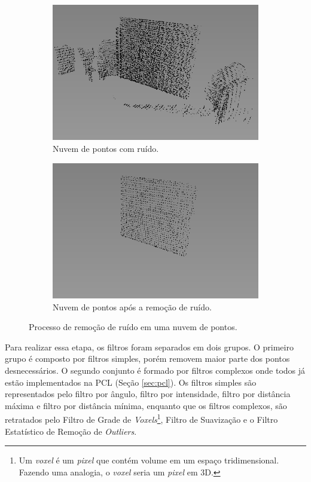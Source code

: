 \begin{figure}[H]
    \centering
    \begin{subfigure}[t]{0.49\textwidth}
        \includegraphics[width=\textwidth]{dados/figuras/pc_noise.png}
        \caption{Nuvem de pontos com ruído.}
    \end{subfigure}
    \begin{subfigure}[t]{0.49\textwidth}
        \includegraphics[width=\textwidth]{dados/figuras/pc_denoise.png}
        \caption{Nuvem de pontos após a remoção de ruído.}
    \end{subfigure}
    \caption{Processo de remoção de ruído em uma nuvem de pontos.}
    \label{fig:point_cloud_denoise}
\end{figure}

Para realizar essa etapa, os filtros foram separados em dois grupos.
O primeiro grupo é composto por filtros simples, porém removem maior parte dos pontos desnecessários. 
O segundo conjunto é formado por filtros complexos onde todos já estão implementados na PCL (Seção \ref{sec:pcl}).
Os filtros simples são representados pelo filtro por ângulo, filtro por intensidade, filtro por distância máxima e filtro por distância mínima, enquanto que os filtros complexos, são retratados pelo Filtro de Grade de \textit{Voxels}\footnote{Um \textit{voxel} é um \textit{pixel} que contém volume em um espaço tridimensional. Fazendo uma analogia, o \textit{voxel} seria um \textit{pixel} em 3D.}, Filtro de Suavização e o Filtro Estatístico de Remoção de \textit{Outliers}.


